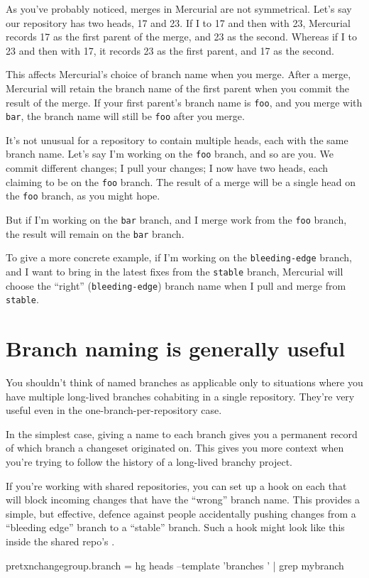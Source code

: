 As you've probably noticed, merges in Mercurial are not symmetrical.
Let's say our repository has two heads, 17 and 23.  If I
 to 17 and then  with 23, Mercurial records
17 as the first parent of the merge, and 23 as the second.  Whereas if
I  to 23 and then  with 17, it records 23
as the first parent, and 17 as the second.

This affects Mercurial's choice of branch name when you merge.  After
a merge, Mercurial will retain the branch name of the first parent
when you commit the result of the merge.  If your first parent's
branch name is \texttt{foo}, and you merge with \texttt{bar}, the
branch name will still be \texttt{foo} after you merge.

It's not unusual for a repository to contain multiple heads, each with
the same branch name.  Let's say I'm working on the \texttt{foo}
branch, and so are you.  We commit different changes; I pull your
changes; I now have two heads, each claiming to be on the \texttt{foo}
branch.  The result of a merge will be a single head on the
\texttt{foo} branch, as you might hope.

But if I'm working on the \texttt{bar} branch, and I merge work from
the \texttt{foo} branch, the result will remain on the \texttt{bar}
branch.

To give a more concrete example, if I'm working on the
\texttt{bleeding-edge} branch, and I want to bring in the latest fixes
from the \texttt{stable} branch, Mercurial will choose the ``right''
(\texttt{bleeding-edge}) branch name when I pull and merge from
\texttt{stable}.

\section{Branch naming is generally useful}

You shouldn't think of named branches as applicable only to situations
where you have multiple long-lived branches cohabiting in a single
repository.  They're very useful even in the one-branch-per-repository
case.  

In the simplest case, giving a name to each branch gives you a
permanent record of which branch a changeset originated on.  This
gives you more context when you're trying to follow the history of a
long-lived branchy project.

If you're working with shared repositories, you can set up a
 hook on each that will block incoming changes
that have the ``wrong'' branch name.  This provides a simple, but
effective, defence against people accidentally pushing changes from a
``bleeding edge'' branch to a ``stable'' branch.  Such a hook might
look like this inside the shared repo's \hgrc.
\begin{codesample2}
  [hooks]
  pretxnchangegroup.branch = hg heads --template '{branches} ' | grep mybranch
\end{codesample2}

